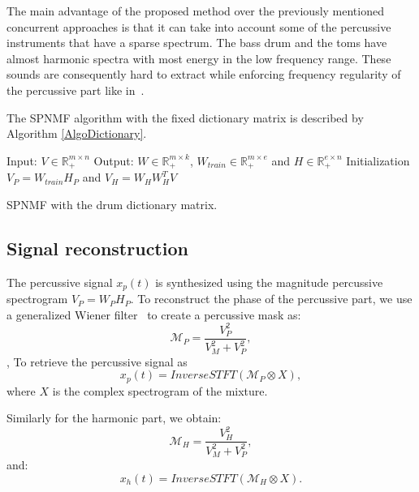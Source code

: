
The main advantage of the proposed method over the previously mentioned concurrent approaches is that it can take into account some of the percussive instruments that have a sparse spectrum. The bass drum and the toms have almost harmonic spectra with most energy in the low frequency range. These sounds are consequently hard to extract while enforcing frequency regularity of the percussive part like in~\cite{canadas2014percussive,ono2008separation}.

The SPNMF algorithm with the fixed dictionary matrix is described by Algorithm \ref{AlgoDictionary}.
 
\begin{algorithm}[h]
 Input: $V \in \mathbb{R}_{+}^{m \times n} $
 Output: $W \in \mathbb{R}_{+}^{m \times k}$, $W_{train} \in \mathbb{R}_+^{m \times e}$ and $H \in \mathbb{R}_{+}^{e \times n}$
 Initialization\;
 $ V_P = W_{train}H_P $ and
 $ V_H = W_HW_H^TV $ 
  
\vspace{0.2cm}
 \caption{SPNMF with the drum dictionary matrix.}\label{AlgoDictionary}
\end{algorithm}


 
 
\subsection{Signal reconstruction}

The percussive signal $x_p(t)$ is synthesized using the magnitude percussive spectrogram $V_P = W_PH_P$. To reconstruct the phase of the percussive part, we use a generalized Wiener filter~\cite{liutkus:hal-01110028} to create a percussive mask as:
\begin{equation}
\mathcal{M}_P = \frac{V_P^2}{V_M^2 + V_P^2},
\end{equation} 
\noindent, To retrieve the percussive signal as 
\begin{equation}
x_p(t) = InverseSTFT(\mathcal{M}_P \otimes X),
\end{equation}
\noindent where $X$ is the complex spectrogram of the mixture.

Similarly for the harmonic part, we obtain:
\begin{equation}\label{percuwiener}
\mathcal{M}_H = \frac{V_H^2}{V_M^2 + V_P^2},
\end{equation}
and:
\begin{equation}
x_h(t) = InverseSTFT(\mathcal{M}_H \otimes X).
\end{equation}


